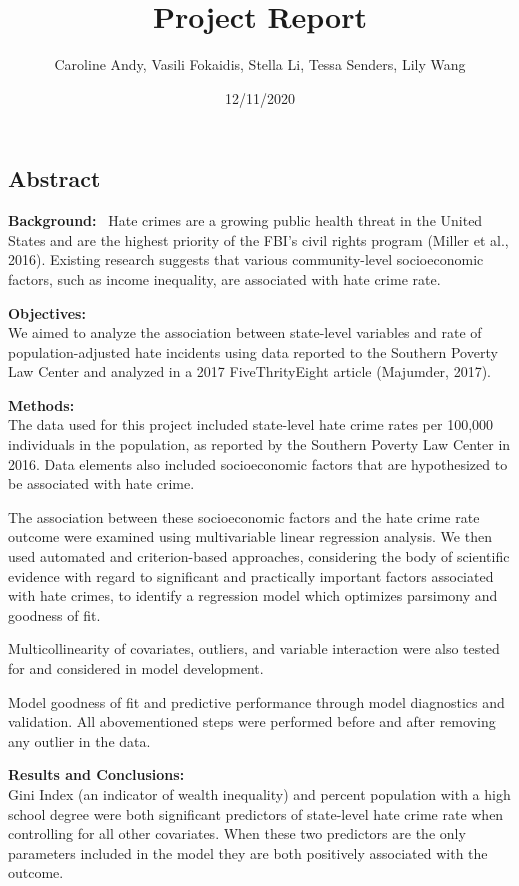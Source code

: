 \documentclass[
]{article}
\title{Project Report}
\author{Caroline Andy, Vasili Fokaidis, Stella Li, Tessa Senders, Lily Wang}
\date{12/11/2020}
\begin{document}
\maketitle

\hypertarget{abstract}{%
\subsection{Abstract}\label{abstract}}

\textbf{Background:}~ Hate crimes are a growing public health threat in
the United States and are the highest priority of the FBI's civil rights
program (Miller et al., 2016). Existing research suggests that various
community-level socioeconomic factors, such as income inequality, are
associated with hate crime rate.

\textbf{Objectives:}\\
We aimed to analyze the association between state-level variables and
rate of population-adjusted hate incidents using data reported to the
Southern Poverty Law Center and analyzed in a 2017 FiveThrityEight
article (Majumder, 2017).

\textbf{Methods:}\\
The data used for this project included state-level hate crime rates per
100,000 individuals in the population, as reported by the Southern
Poverty Law Center in 2016. Data elements also included socioeconomic
factors that are hypothesized to be associated with hate crime.

The association between these socioeconomic factors and the hate crime
rate outcome were examined using multivariable linear regression
analysis. We then used automated and criterion-based approaches,
considering the body of scientific evidence with regard to significant
and practically important factors associated with hate crimes, to
identify a regression model which optimizes parsimony and goodness of
fit.

Multicollinearity of covariates, outliers, and variable interaction were
also tested for and considered in model development.

Model goodness of fit and predictive performance through model
diagnostics and validation. All abovementioned steps were performed
before and after removing any outlier in the data.

\textbf{Results and Conclusions:}\\
Gini Index (an indicator of wealth inequality) and percent population
with a high school degree were both significant predictors of
state-level hate crime rate when controlling for all other covariates.
When these two predictors are the only parameters included in the model
they are both positively associated with the outcome.
\end{document}
